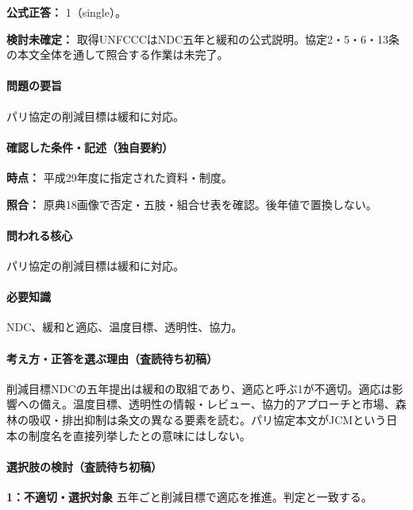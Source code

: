 \textbf{公式正答：} 1（single）。

\par\textbf{検討未確定：} 取得UNFCCCはNDC五年と緩和の公式説明。協定2・5・6・13条の本文全体を通して照合する作業は未完了。

\paragraph{問題の要旨} パリ協定の削減目標は緩和に対応。

\paragraph{確認した条件・記述（独自要約）}\mbox{}\par

\noindent\textbf{時点：} 平成29年度に指定された資料・制度。\par

\noindent\textbf{照合：} 原典18画像で否定・五肢・組合せ表を確認。後年値で置換しない。\par

\paragraph{問われる核心} パリ協定の削減目標は緩和に対応。

\paragraph{必要知識} NDC、緩和と適応、温度目標、透明性、協力。

\paragraph{考え方・正答を選ぶ理由（査読待ち初稿）} 削減目標NDCの五年提出は緩和の取組であり、適応と呼ぶ1が不適切。適応は影響への備え。温度目標、透明性の情報・レビュー、協力的アプローチと市場、森林の吸収・排出抑制は条文の異なる要素を読む。パリ協定本文がJCMという日本の制度名を直接列挙したとの意味にはしない。

\paragraph{選択肢の検討（査読待ち初稿）}\mbox{}\par

\noindent\textbf{1：不適切・選択対象} 五年ごと削減目標で適応を推進。判定と一致する。\par

